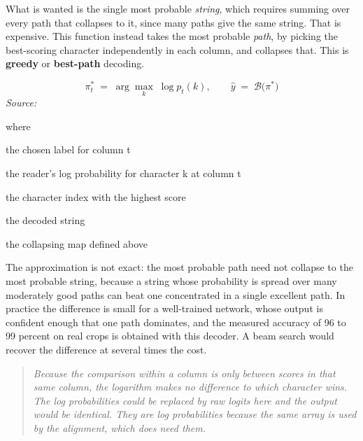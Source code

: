 What is wanted is the single most probable \emph{string}, which requires summing over every path that collapses to it, since many paths give the same string. That is expensive. This function instead takes the most probable \emph{path}, by picking the best-scoring character independently in each column, and collapses that. This is \textbf{greedy} or \textbf{best-path} decoding.


\begin{equation}
\pi^{*}_t \;=\; \arg\max_{k} \; \log p_t(k), \qquad \hat{y} \;=\; \mathcal{B}\big(\pi^{*}\big)
\end{equation}
\noindent\emph{Source: }\cite{graves2006}


\noindent where
\begin{description}[leftmargin=2.4em,style=nextline,font=\normalfont\ttfamily]\setlength\itemsep{1pt}
  \item[{$\pi^{*}_t$}] \normalfont the chosen label for column t
  \item[{$\log p_t(k)$}] \normalfont the reader's log probability for character k at column t
  \item[{$\arg\max_k$}] \normalfont the character index with the highest score
  \item[{$\hat{y}$}] \normalfont the decoded string
  \item[{$\mathcal{B}$}] \normalfont the collapsing map defined above
\end{description}
The approximation is not exact: the most probable path need not collapse to the most probable string, because a string whose probability is spread over many moderately good paths can beat one concentrated in a single excellent path. In practice the difference is small for a well-trained network, whose output is confident enough that one path dominates, and the measured accuracy of 96 to 99 percent on real crops is obtained with this decoder. A beam search would recover the difference at several times the cost.


\begin{quote}\small\itshape Because the comparison within a column is only between scores in that same column, the logarithm makes no difference to which character wins. The log probabilities could be replaced by raw logits here and the output would be identical. They are log probabilities because the same array is used by the alignment, which does need them.\end{quote}


